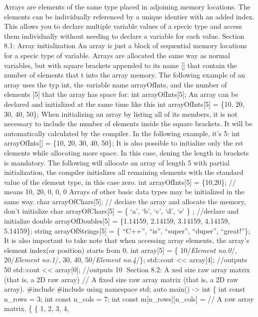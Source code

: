 Arrays are elements of the same type placed in adjoining memory
locations. The elements can be individually referenced by a unique
identier with an added index. This allows you to declare multiple
variable values of a specic type and access them individually without
needing to declare a variable for each value. Section 8.1: Array
initialization An array is just a block of sequential memory locations
for a specic type of variable. Arrays are allocated the same way as
normal variables, but with square brackets appended to its name {[}{]}
that contain the number of elements that t into the array memory. The
following example of an array uses the typ int, the variable name
arrayOfInts, and the number of elements {[}5{]} that the array has space
for: int arrayOfInts{[}5{]}; An array can be declared and initialized at
the same time like this int arrayOfInts{[}5{]} = \{10, 20, 30, 40, 50\};
When initializing an array by listing all of its members, it is not
necessary to include the number of elements inside the square brackets.
It will be automatically calculated by the compiler. In the following
example, it's 5: int arrayOfInts{[}{]} = \{10, 20, 30, 40, 50\}; It is
also possible to initialize only the rst elements while allocating more
space. In this case, dening the length in brackets is mandatory. The
following will allocate an array of length 5 with partial
initialization, the compiler initializes all remaining elements with the
standard value of the element type, in this case zero. int
arrayOfInts{[}5{]} = \{10,20\}; // means 10, 20, 0, 0, 0 Arrays of other
basic data types may be initialized in the same way. char
arrayOfChars{[}5{]}; // declare the array and allocate the memory, don't
initialize char arrayOfChars{[}5{]} = \{ `a', `b', `c', `d', `e' \} ;
//declare and initialize double arrayOfDoubles{[}5{]} = \{1.14159,
2.14159, 3.14159, 4.14159, 5.14159\}; string arrayOfStrings{[}5{]} = \{
``C++'', ``is'', ``super'', ``duper'', ``great!''\}; It is also
important to take note that when accessing array elements, the array's
element index(or position) starts from 0. int array{[}5{]} = \{
10/\emph{Element no.0}/, 20/\emph{Element no.1}/, 30, 40,
50/\emph{Element no.4}/\}; std::cout \textless\textless{} array{[}4{]};
//outputs 50 std::cout \textless\textless{} array{[}0{]}; //outputs 10
Section 8.2: A xed size raw array matrix (that is, a 2D raw array) // A
fixed size raw array matrix (that is, a 2D raw array). \#include
\#include using namespace std; auto main() -\textgreater{} int \{ int
const n\_rows = 3; int const n\_cols = 7; int const
m{[}n\_rows{]}{[}n\_cols{]} = // A raw array matrix. \{ \{ 1, 2, 3, 4,
